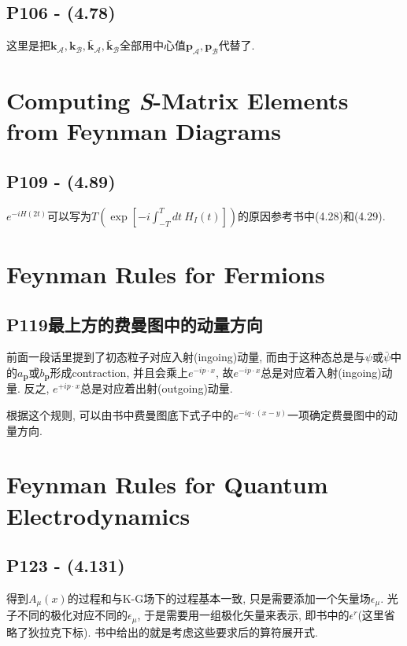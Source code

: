 \subsection{P106 - (4.78)}

这里是把$\mathbf{k}_{\mathcal{A}}, \mathbf{k}_{\mathcal{B}}, \bar{\mathbf{k}}_{\mathcal{A}}, \bar{\mathbf{k}}_{\mathcal{B}}$全部用中心值$\mathbf{p}_{\mathcal{A}}, \mathbf{p}_{\mathcal{B}}$代替了.

\section{Computing \textit{S}-Matrix Elements from Feynman Diagrams}

\subsection{P109 - (4.89)}

$e^{-iH(2t)}$可以写为$T(\exp[-i\int_{-T}^{T}dt\ H_I(t)])$的原因参考书中(4.28)和(4.29).

\section{Feynman Rules for Fermions}

\subsection{P119最上方的费曼图中的动量方向}

前面一段话里提到了初态粒子对应入射(ingoing)动量, 而由于这种态总是与$\psi$或$\bar{\psi}$中的$a_{\mathbf{p}}$或$b_{\mathbf{p}}$形成contraction, 并且会乘上$e^{-ip\cdot x}$, 故$e^{-ip\cdot x}$总是对应着入射(ingoing)动量.
反之, $e^{+ip\cdot x}$总是对应着出射(outgoing)动量.

根据这个规则, 可以由书中费曼图底下式子中的$e^{-iq\cdot (x-y)}$一项确定费曼图中的动量方向.

\section{Feynman Rules for Quantum Electrodynamics}

\subsection{P123 - (4.131)}

得到$A_\mu(x)$的过程和与K-G场下的过程基本一致, 只是需要添加一个矢量场$\epsilon_\mu$.
光子不同的极化对应不同的$\epsilon_\mu$, 于是需要用一组极化矢量来表示, 即书中的$\epsilon^r$(这里省略了狄拉克下标).
书中给出的就是考虑这些要求后的算符展开式.